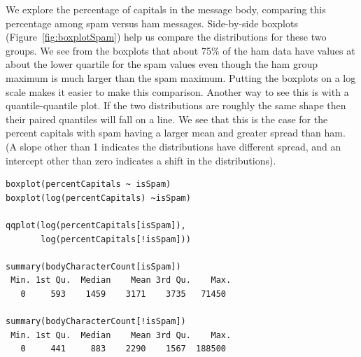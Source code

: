 We explore the percentage of capitals in the message body, 
comparing this percentage among spam versus ham messages.  
Side-by-side boxplots (Figure~\ref{fig:boxplotSpam}) help 
us compare the distributions for these two groups.
We see from the boxplots that about 75\% of the ham
data have values at about the lower quartile for the spam
values even though the ham group maximum is much larger
than the spam maximum.  Putting the boxplots on a log
scale makes it easier to make this comparison.
Another way to see this is with a quantile-quantile 
plot. If the two distributions are roughly the same shape
then their paired quantiles will fall on a line.
We see that this is the case for the percent capitals
with spam having a larger mean and greater spread than ham. 
(A slope other than 1 indicates the distributions have
different spread, and an intercept other than zero indicates
a shift in the distributions).

\begin{verbatim}
boxplot(percentCapitals ~ isSpam)
boxplot(log(percentCapitals) ~isSpam)

qqplot(log(percentCapitals[isSpam]),
       log(percentCapitals[!isSpam]))

summary(bodyCharacterCount[isSpam])    
 Min. 1st Qu.  Median    Mean 3rd Qu.    Max.
   0     593    1459    3171    3735   71450

summary(bodyCharacterCount[!isSpam])
 Min. 1st Qu.  Median    Mean 3rd Qu.    Max.
   0     441     883    2290    1567  188500
\end{verbatim}

